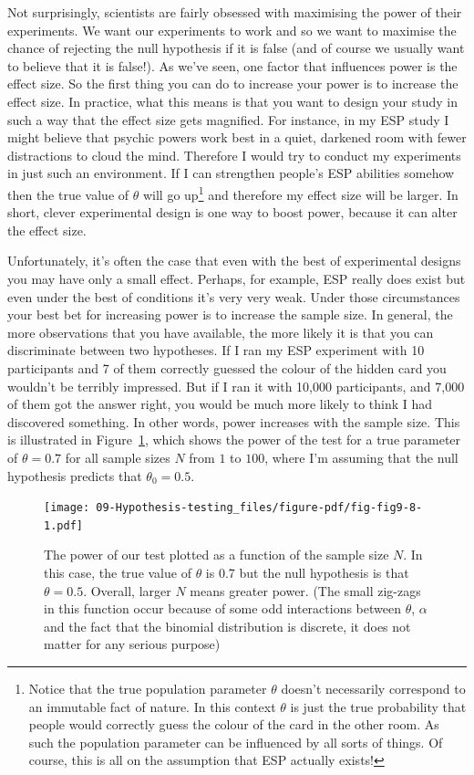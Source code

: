 \documentclass[
  a4paper,
]{book}
\begin{document}
Not surprisingly, scientists are fairly obsessed with maximising the
power of their experiments. We want our experiments to work and so we
want to maximise the chance of rejecting the null hypothesis if it is
false (and of course we usually want to believe that it is false!). As
we've seen, one factor that influences power is the effect size. So the
first thing you can do to increase your power is to increase the effect
size. In practice, what this means is that you want to design your study
in such a way that the effect size gets magnified. For instance, in my
ESP study I might believe that psychic powers work best in a quiet,
darkened room with fewer distractions to cloud the mind. Therefore I
would try to conduct my experiments in just such an environment. If I
can strengthen people's ESP abilities somehow then the true value of
\(\theta\) will go up\footnote{Notice that the true population parameter
  \(\theta\) doesn't necessarily correspond to an immutable fact of
  nature. In this context \(\theta\) is just the true probability that
  people would correctly guess the colour of the card in the other room.
  As such the population parameter can be influenced by all sorts of
  things. Of course, this is all on the assumption that ESP actually
  exists!} and therefore my effect size will be larger. In short, clever
experimental design is one way to boost power, because it can alter the
effect size.

Unfortunately, it's often the case that even with the best of
experimental designs you may have only a small effect. Perhaps, for
example, ESP really does exist but even under the best of conditions
it's very very weak. Under those circumstances your best bet for
increasing power is to increase the sample size. In general, the more
observations that you have available, the more likely it is that you can
discriminate between two hypotheses. If I ran my ESP experiment with 10
participants and 7 of them correctly guessed the colour of the hidden
card you wouldn't be terribly impressed. But if I ran it with 10,000
participants, and 7,000 of them got the answer right, you would be much
more likely to think I had discovered something. In other words, power
increases with the sample size. This is illustrated in
Figure~\ref{fig-fig9-8}, which shows the power of the test for a true
parameter of \(\theta = 0.7\) for all sample sizes \(N\) from \(1\) to
\(100\), where I'm assuming that the null hypothesis predicts that
\(\theta_0 = 0.5\).

\begin{figure}

\texttt{[image: 09-Hypothesis-testing\_files/figure-pdf/fig-fig9-8-1.pdf]} \hfill{}

\caption{\label{fig-fig9-8}The power of our test plotted as a function
of the sample size \(N\). In this case, the true value of \(\theta\) is
0.7 but the null hypothesis is that \(\theta = 0.5\). Overall, larger
\(N\) means greater power. (The small zig-zags in this function occur
because of some odd interactions between \(\theta\), \(\alpha\) and the
fact that the binomial distribution is discrete, it does not matter for
any serious purpose)}

\end{figure}
\end{document}
